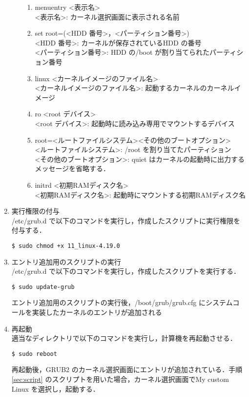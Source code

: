 \documentclass[12pt]{jsarticle}
\begin{document}
\begin{enumerate}
\begin{enumerate}
\begin{enumerate}
\item menuentry \textless 表示名\textgreater \\
  \textless 表示名\textgreater : カーネル選択画面に表示される名前
\item set root=(\textless HDD 番号\textgreater ，\textless パーティション番号\textgreater )\\
  \textless HDD 番号\textgreater : カーネルが保存されているHDD の番号\\
  \textless パーティション番号\textgreater : HDD の/boot が割り当てられたパーティション番号
\item linux \textless カーネルイメージのファイル名\textgreater \\
  \textless カーネルイメージのファイル名\textgreater : 起動するカーネルのカーネルイメージ
\item ro \textless root デバイス\textgreater \\
  \textless root デバイス\textgreater : 起動時に読み込み専用でマウントするデバイス
\item root=\textless ルートファイルシステム\textgreater  \textless その他のブートオプション\textgreater \\
  \textless ルートファイルシステム\textgreater : /root を割り当てたパーティション\\
  \textless その他のブートオプション\textgreater : quiet はカーネルの起動時に出力するメッセージを省略する．
\item initrd \textless 初期RAMディスク名\textgreater \\
  \textless 初期RAMディスク名\textgreater : 起動時にマウントする初期RAMディスク名
\end{enumerate}
  \end{enumerate}
\item 実行権限の付与\\
  /etc/grub.d で以下のコマンドを実行し，作成したスクリプトに実行権限を付与する．
\begin{verbatim}
$ sudo chmod +x 11_linux-4.19.0
\end{verbatim}
\item エントリ追加用のスクリプトの実行\\
  /etc/grub.d で以下のコマンドを実行し，作成したスクリプトを実行する．
\begin{verbatim}
$ sudo update-grub
\end{verbatim}
エントリ追加用のスクリプトの実行後，/boot/grub/grub.cfg にシステムコールを実装したカーネルのエントリが追加される
\item 再起動\\
  適当なディレクトリで以下のコマンドを実行し，計算機を再起動させる．
\begin{verbatim}
$ sudo reboot
\end{verbatim}
再起動後，GRUB2 のカーネル選択画面にエントリが追加されている．手順\ref{sec:script} のスクリプトを用いた場合，カーネル選択画面でMy custom Linux を選択し，起動する．
\end{enumerate}
\end{document}
